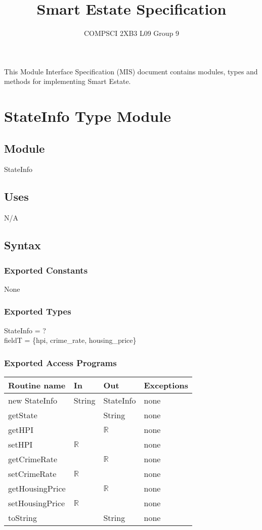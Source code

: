 \documentclass[12pt]{article}
\title{Smart Estate Specification}
\author{COMPSCI 2XB3 L09 Group 9}
\begin{document}
\maketitle
This Module Interface Specification (MIS) document contains modules, types and
methods for implementing Smart Estate.

\newpage

\section* {StateInfo Type Module}

\subsection*{Module}

StateInfo

\subsection* {Uses}

N/A

\subsection* {Syntax}

\subsubsection* {Exported Constants}

None

\subsubsection* {Exported Types}

StateInfo = ?\\
fieldT = \{hpi, crime\_rate, housing\_price\}

\subsubsection* {Exported Access Programs}

\begin{tabular}{| l | l | l | p{5cm} |}
\hline
\textbf{Routine name} & \textbf{In} & \textbf{Out} & \textbf{Exceptions}\\
\hline
new StateInfo & String & StateInfo & none\\
\hline
getState &  & String & none\\
\hline
getHPI & & $\mathbb{R}$ & none\\
\hline
setHPI & $\mathbb{R}$ &  & none\\
\hline
getCrimeRate & & $\mathbb{R}$ & none\\
\hline
setCrimeRate & $\mathbb{R}$ &  & none\\
\hline
getHousingPrice & & $\mathbb{R}$ & none\\
\hline
setHousingPrice & $\mathbb{R}$ &  & none\\
\hline
toString & & String & none\\
\hline
\end{tabular}
\end{document}
